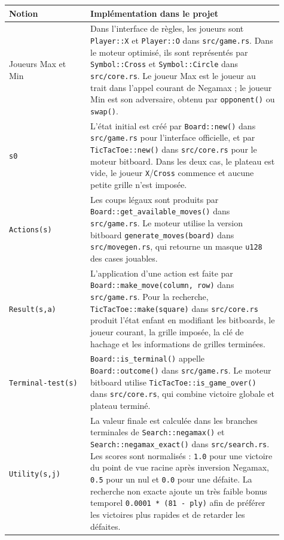 \documentclass{pssbmac}
\begin{document}
\begin{center}
\small
\begin{tabular}{p{0.27\linewidth}p{0.64\linewidth}}
\hline
\rowcolor{TableHeader}
\textbf{Notion} & \textbf{Implémentation dans le projet} \\
\hline
Joueurs Max et Min & Dans l'interface de règles, les joueurs sont \texttt{Player::X} et \texttt{Player::O} dans \texttt{src/game.rs}. Dans le moteur optimisé, ils sont représentés par \texttt{Symbol::Cross} et \texttt{Symbol::Circle} dans \texttt{src/core.rs}. Le joueur Max est le joueur au trait dans l'appel courant de Negamax ; le joueur Min est son adversaire, obtenu par \texttt{opponent()} ou \texttt{swap()}. \\
\texttt{s0} & L'état initial est créé par \texttt{Board::new()} dans \texttt{src/game.rs} pour l'interface officielle, et par \texttt{TicTacToe::new()} dans \texttt{src/core.rs} pour le moteur bitboard. Dans les deux cas, le plateau est vide, le joueur \texttt{X}/\texttt{Cross} commence et aucune petite grille n'est imposée. \\
\texttt{Actions(s)} & Les coups légaux sont produits par \texttt{Board::get\_available\_moves()} dans \texttt{src/game.rs}. Le moteur utilise la version bitboard \texttt{generate\_moves(board)} dans \texttt{src/movegen.rs}, qui retourne un masque \texttt{u128} des cases jouables. \\
\texttt{Result(s,a)} & L'application d'une action est faite par \texttt{Board::make\_move(column, row)} dans \texttt{src/game.rs}. Pour la recherche, \texttt{TicTacToe::make(square)} dans \texttt{src/core.rs} produit l'état enfant en modifiant les bitboards, le joueur courant, la grille imposée, la clé de hachage et les informations de grilles terminées. \\
\texttt{Terminal-test(s)} & \texttt{Board::is\_terminal()} appelle \texttt{Board::outcome()} dans \texttt{src/game.rs}. Le moteur bitboard utilise \texttt{TicTacToe::is\_game\_over()} dans \texttt{src/core.rs}, qui combine victoire globale et plateau terminé. \\
\texttt{Utility(s,j)} & La valeur finale est calculée dans les branches terminales de \texttt{Search::negamax()} et \texttt{Search::negamax\_exact()} dans \texttt{src/search.rs}. Les scores sont normalisés : \texttt{1.0} pour une victoire du point de vue racine après inversion Negamax, \texttt{0.5} pour un nul et \texttt{0.0} pour une défaite. La recherche non exacte ajoute un très faible bonus temporel \texttt{0.0001 * (81 - ply)} afin de préférer les victoires plus rapides et de retarder les défaites. \\
\hline
\end{tabular}
\end{center}
\end{document}
